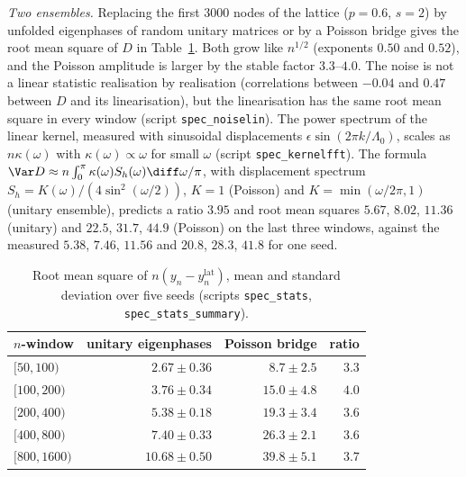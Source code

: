\emph{Two ensembles.} Replacing the first $3000$ nodes of the lattice ($p=0.6$, $s=2$) by unfolded eigenphases of random
unitary matrices or by a Poisson bridge gives the root mean square of $D$ in Table~\ref{tab:noise}. Both grow like $n^{1/2}$
(exponents $0.50$ and $0.52$), and the Poisson amplitude is larger by the stable factor $3.3$--$4.0$. The noise is not a
linear statistic realisation by realisation (correlations between $-0.04$ and $0.47$ between $D$ and its linearisation), but the
linearisation has the same root mean square in every window (script \texttt{spec\_noiselin}). The power spectrum of the
linear kernel, measured with sinusoidal displacements $\epsilon\sin(2\pi k/\Lambda_0)$, scales as $n\kappa(\omega)$ with
$\kappa(\omega)\propto\omega$ for small $\omega$ (script \texttt{spec\_kernelfft}). The formula
$\Var D\approx n\int_0^\pi\kappa(\omega)S_h(\omega)\diff\omega/\pi$, with displacement spectrum
$S_h=K(\omega)/(4\sin^2(\omega/2))$, $K=1$ (Poisson) and $K=\min(\omega/2\pi,1)$ (unitary ensemble), predicts a ratio $3.95$ and
root mean squares $5.67$, $8.02$, $11.36$ (unitary) and $22.5$, $31.7$, $44.9$ (Poisson) on the last three windows, against the
measured $5.38$, $7.46$, $11.56$ and $20.8$, $28.3$, $41.8$ for one seed.

\begin{table}[ht]
\centering
\small
\begin{tabular}{lrrr}
\toprule
$n$-window & unitary eigenphases & Poisson bridge & ratio\\
\midrule
$[50,100)$ & $2.67\pm0.36$ & $8.7\pm2.5$ & $3.3$\\
$[100,200)$ & $3.76\pm0.34$ & $15.0\pm4.8$ & $4.0$\\
$[200,400)$ & $5.38\pm0.18$ & $19.3\pm3.4$ & $3.6$\\
$[400,800)$ & $7.40\pm0.33$ & $26.3\pm2.1$ & $3.6$\\
$[800,1600)$ & $10.68\pm0.50$ & $39.8\pm5.1$ & $3.7$\\
\bottomrule
\end{tabular}
\caption{Root mean square of $n(y_n-y_n^{\mathrm{lat}})$, mean and standard deviation over five seeds (scripts
\texttt{spec\_stats}, \texttt{spec\_stats\_summary}).}
\label{tab:noise}
\end{table}
